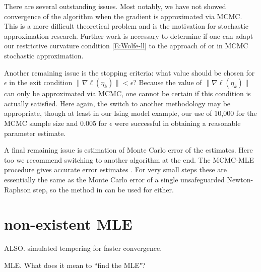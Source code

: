 There are several outstanding issues.  Most notably, we have not showed convergence of 
the algorithm when the gradient 
is approximated via MCMC.  This is a more difficult theoretical problem and is the 
motivation for stochastic 
approximation research.  
Further work is necessary to determine if one can adapt our restrictive curvature 
condition \eqref{E:Wolfe-ll} to the 
approach of \citet{Andrieu:2005} or \citet{Liang:2010} in MCMC stochastic 
approximation.  

Another remaining issue is the stopping criteria: what value should be chosen for $
\epsilon$ in the exit condition
$\lVert  \nabla \ell( \eta_k ) \rVert < \epsilon$?  Because the value of $\lVert  
\nabla \ell( \eta_k ) \rVert$ can only 
be approximated via MCMC, one cannot be certain if this condition is actually 
satisfied.  Here again, the switch to 
another methodology may be appropriate, though at least in our Ising model example, 
our use of 10,000 for the MCMC 
sample size and 0.005 for $\epsilon$ were successful in obtaining a reasonable 
parameter estimate. 

 A final remaining issue is estimation of Monte Carlo error of the estimates.  Here 
too we recommend switching to another
algorithm at the end.  The MCMC-MLE procedure gives accurate error estimates 
\citep{Geyer:1994}.
For very small steps these are essentially the same as the Monte Carlo error of a 
single unsafeguarded Newton-Raphson step,
so the method in \citep{Geyer:1994} can be used for either.

\section{non-existent MLE}
ALSO.  simulated tempering for faster convergence.

MLE.  What does it mean to ``find the MLE"?
